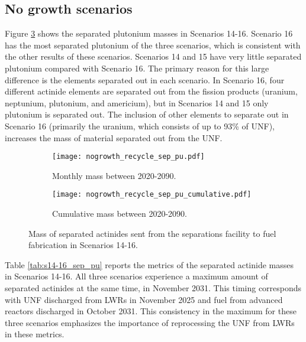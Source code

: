 \subsection{No growth scenarios}
Figure \ref{fig:nogrowth_recycle_sep_pu} shows the separated plutonium 
masses in Scenarios 14-16. Scenario 16 has the most separated 
plutonium of the three scenarios, which is consistent with the other 
results of these scenarios. Scenarios 14 and 15 have very little 
separated plutonium compared with Scenario 16. The primary reason 
for this large difference is the elements separated out in 
each scenario. In Scenario 16, four different actinide elements 
are separated out from the fission products (uranium, neptunium,
plutonium, and americium), but in Scenarios 14 and 15 only plutonium 
is separated out. The inclusion of other elements to separate out 
in Scenario 16 (primarily the uranium, which consists of up to 
93\% of \gls{UNF}), increases the mass of material  
separated out from the \gls{UNF}. 

\begin{figure}[h!]
    \centering
    \begin{subfigure}[b]{0.49\textwidth}
        \centering
        \texttt{[image: nogrowth\_recycle\_sep\_pu.pdf]}
        \caption{Monthly mass between 2020-2090.}
        \label{fig:nogrowth_recycle_sep_pu_all}
    \end{subfigure}
    \hfill
    \begin{subfigure}[b]{0.49\textwidth}
        \centering
        \texttt{[image: nogrowth\_recycle\_sep\_pu\_cumulative.pdf]}
        \caption{Cumulative mass between 2020-2090.}
        \label{fig:nogrowth_recycle_sep_pu_cumulative}
    \end{subfigure}
       \caption{Mass of separated actinides sent from the 
       separations facility to fuel fabrication in Scenarios 14-16.}
       \label{fig:nogrowth_recycle_sep_pu}
\end{figure}

Table \ref{tab:s14-16_sep_pu} reports the metrics of the separated 
actinide masses in Scenarios 14-16. All three scenarios experience a 
maximum amount of separated actinides at the same time, in 
November 2031. This timing corresponds with \gls{UNF} discharged 
from \glspl{LWR} in November 2025 and fuel from advanced reactors
discharged in October 2031. This consistency in the maximum 
for these three scenarios emphasizes the importance of reprocessing 
the \gls{UNF} from \glspl{LWR} in these metrics.  

